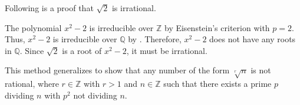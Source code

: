 \documentclass[12pt]{article}
\begin{document}
Following is a proof that $\sqrt{2}$ is irrational.

The polynomial $x^2-2$ is irreducible over $\mathbb{Z}$ by Eisenstein's criterion with $p=2$.  Thus, $x^2-2$ is irreducible over $\mathbb{Q}$ by .  Therefore, $x^2-2$ does not have any roots in $\mathbb{Q}$.  Since $\sqrt{2}$ is a root of $x^2-2$, it must be irrational.

This method generalizes to show that any number of the form $\sqrt[r]{n}$ is not rational, where $r \in \mathbb{Z}$ with $r>1$ and $n \in \mathbb{Z}$ such that there exists a prime $p$ dividing $n$ with $p^2$ not dividing $n$.
\end{document}

